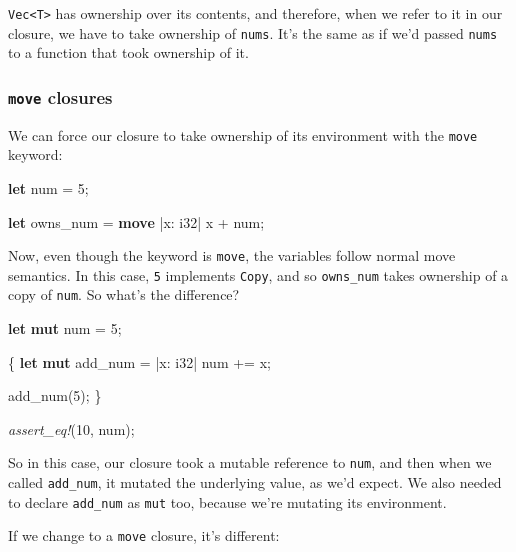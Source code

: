 \documentclass[a4paper,]{book}
\newenvironment{Shaded}{\begin{snugshade}}{\end{snugshade}}
\newcommand{\KeywordTok}[1]{\textcolor[rgb]{0.13,0.29,0.53}{\textbf{{#1}}}}
\newcommand{\DataTypeTok}[1]{\textcolor[rgb]{0.13,0.29,0.53}{{#1}}}
\newcommand{\DecValTok}[1]{\textcolor[rgb]{0.00,0.00,0.81}{{#1}}}
\newcommand{\PreprocessorTok}[1]{\textcolor[rgb]{0.56,0.35,0.01}{\textit{{#1}}}}
\newcommand{\NormalTok}[1]{{#1}}
\begin{document}
\texttt{Vec\textless{}T\textgreater{}} has ownership over its contents,
and therefore, when we refer to it in our closure, we have to take
ownership of \texttt{nums}. It's the same as if we'd passed
\texttt{nums} to a function that took ownership of it.

\subsubsection{\texorpdfstring{\texttt{move}
closures}{move closures}}\label{move-closures}

We can force our closure to take ownership of its environment with the
\texttt{move} keyword:

\begin{Shaded}
\begin{Highlighting}[]
\KeywordTok{let} \NormalTok{num = }\DecValTok{5}\NormalTok{;}

\KeywordTok{let} \NormalTok{owns_num = }\KeywordTok{move} \NormalTok{|x: }\DataTypeTok{i32}\NormalTok{| x + num;}
\end{Highlighting}
\end{Shaded}

Now, even though the keyword is \texttt{move}, the variables follow
normal move semantics. In this case, \texttt{5} implements
\texttt{Copy}, and so \texttt{owns\_num} takes ownership of a copy of
\texttt{num}. So what's the difference?

\begin{Shaded}
\begin{Highlighting}[]
\KeywordTok{let} \KeywordTok{mut} \NormalTok{num = }\DecValTok{5}\NormalTok{;}

\NormalTok{\{}
    \KeywordTok{let} \KeywordTok{mut} \NormalTok{add_num = |x: }\DataTypeTok{i32}\NormalTok{| num += x;}

    \NormalTok{add_num(}\DecValTok{5}\NormalTok{);}
\NormalTok{\}}

\PreprocessorTok{assert_eq!}\NormalTok{(}\DecValTok{10}\NormalTok{, num);}
\end{Highlighting}
\end{Shaded}

So in this case, our closure took a mutable reference to \texttt{num},
and then when we called \texttt{add\_num}, it mutated the underlying
value, as we'd expect. We also needed to declare \texttt{add\_num} as
\texttt{mut} too, because we're mutating its environment.

If we change to a \texttt{move} closure, it's different:
\end{document}
